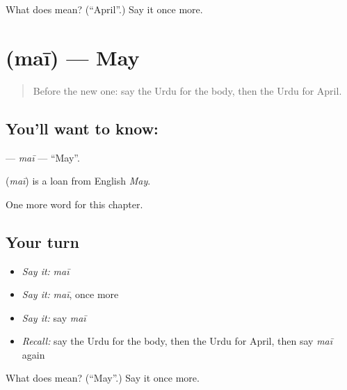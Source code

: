 \begin{tcolorbox}[breakable,colback=teal!4,colframe=teal!35!black,title={Before you move on}]
What does  mean? (\textquotedblleft{}April\textquotedblright{}.) Say it once more.
\end{tcolorbox}
\section[\texorpdfstring{\ur{مئی} (maī)}{مئی (maī)}]{ (maī) — May}

\label{lesson:UR-C188-mai}



\begin{quote}
Before the new one: say the Urdu for the body, then the Urdu for April.
\end{quote}

\subsection*{You'll want to know: }
\textbf{} — \emph{maī} — \textquotedblleft{}May\textquotedblright{}.

\begin{cousinweb}
\textbf{} (\emph{maī}) is a loan from English \emph{May}.
\end{cousinweb}

\begin{grammarlens}[title={What you've built}]
One more word for this chapter.
\end{grammarlens}

\subsection*{Your turn}
\begin{itemize}
\raggedright
  \item \emph{Say it:} \emph{maī}
  \item \emph{Say it:} \emph{maī}, once more
  \item \emph{Say it:} say \emph{maī}
  \item \emph{Recall:} say the Urdu for the body, then the Urdu for April, then say \emph{maī} again
\end{itemize}

\begin{tcolorbox}[breakable,colback=teal!4,colframe=teal!35!black,title={Before you move on}]
What does  mean? (\textquotedblleft{}May\textquotedblright{}.) Say it once more.
\end{tcolorbox}
